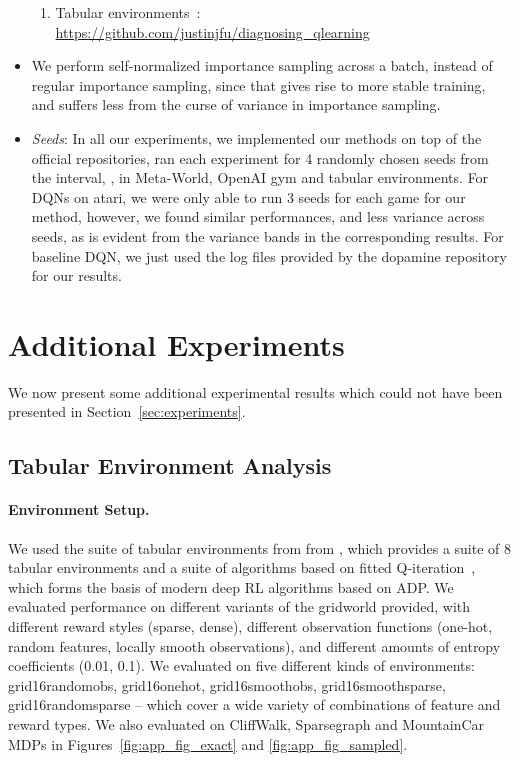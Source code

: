 \documentclass[jmlr]{article}
\begin{document}
\begin{itemize}
\begin{enumerate}
            \item Tabular environments~\citep{fu19diagnosing}: \url{https://github.com/justinjfu/diagnosing_qlearning}
        \end{enumerate}
    \item We perform self-normalized importance sampling across a batch, instead of regular importance sampling, since that gives rise to more stable training, and suffers less from the curse of variance in importance sampling.
    \item \textit{Seeds}: In all our experiments, we implemented our methods on top of the official repositories, ran each experiment for 4 randomly chosen seeds from the interval, , in Meta-World, OpenAI gym and tabular environments. For DQNs on atari, we were only able to run 3 seeds for each game for our method, however, we found similar performances, and less variance across seeds, as is evident from the variance bands in the corresponding results. For baseline DQN, we just used the log files provided by the dopamine repository for our results. 
\end{itemize}  

\section{Additional Experiments}
\label{sec:additional_exps}
We now present some additional experimental results which could not have been presented in Section~\ref{sec:experiments}. 

\subsection{Tabular Environment Analysis}
\label{sec:app_exps_gridworld}
\paragraph{Environment Setup.} We used the suite of tabular environments from from \cite{fu19diagnosing}, which provides a suite of 8 tabular environments and a suite of algorithms based on fitted Q-iteration~\citep{Riedmiller2005}, which forms the basis of modern deep RL algorithms based on ADP. We evaluated performance on different variants of the  gridworld provided, with different reward styles (sparse, dense), different observation functions (one-hot, random features, locally smooth observations), and different amounts of entropy coefficients (0.01, 0.1). We evaluated on five different kinds of environments: grid16randomobs, grid16onehot, grid16smoothobs, grid16smoothsparse, grid16randomsparse -- which cover a wide variety of combinations of feature and reward types. We also evaluated on CliffWalk, Sparsegraph and MountainCar MDPs in Figures~\ref{fig:app_fig_exact} and \ref{fig:app_fig_sampled}. 
\end{document}
